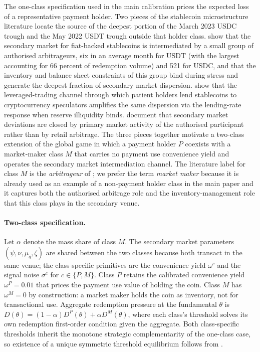 The one-class specification used in the main calibration prices the expected loss of a representative payment holder. Two pieces of the stablecoin microstructure literature locate the source of the deepest portion of the March 2023 USDC trough and the May 2022 USDT trough outside that holder class. \citet{ma_zeng_zhang_2025} show that the secondary market for fiat-backed stablecoins is intermediated by a small group of authorised arbitrageurs, six in an average month for USDT (with the largest accounting for 66 percent of redemption volume) and 521 for USDC, and that the inventory and balance sheet constraints of this group bind during stress and generate the deepest fraction of secondary market dispersion. \citet{gorton_klee_ross_ross_vardoulakis_2026} show that the leveraged-trading channel through which patient holders lend stablecoins to cryptocurrency speculators amplifies the same dispersion via the lending-rate response when reserve illiquidity binds. \citet{lyons_viswanath_natraj_2023} document that secondary market deviations are closed by primary market activity of the authorised participant rather than by retail arbitrage. The three pieces together motivate a two-class extension of the global game in which a payment holder $P$ coexists with a market-maker class $M$ that carries no payment use convenience yield and operates the secondary market intermediation channel. The literature label for class $M$ is the \emph{arbitrageur} of \citet{ma_zeng_zhang_2025}; we prefer the term \emph{market maker} because it is already used as an example of a non-payment holder class in the main paper and it captures both the authorised arbitrage role and the inventory-management role that this class plays in the secondary venue.

\paragraph{Two-class specification.} Let $\alpha$ denote the mass share of class $M$. The secondary market parameters $(\psi, \nu, \mu_q, \zeta)$ are shared between the two classes because both transact in the same venue; the class-specific primitives are the convenience yield $\omega^c$ and the signal noise $\sigma^c$ for $c \in \{P, M\}$. Class $P$ retains the calibrated convenience yield $\omega^P = 0.01$ that prices the payment use value of holding the coin. Class $M$ has $\omega^M = 0$ by construction: a market maker holds the coin as inventory, not for transactional use. Aggregate redemption pressure at the fundamental $\theta$ is $D(\theta) = (1-\alpha) D^P(\theta) + \alpha D^M(\theta)$, where each class's threshold solves its own redemption first-order condition given the aggregate. Both class-specific thresholds inherit the monotone strategic complementarity of the one-class case, so existence of a unique symmetric threshold equilibrium follows from \citet{carlsson_van_damme_1993}.

